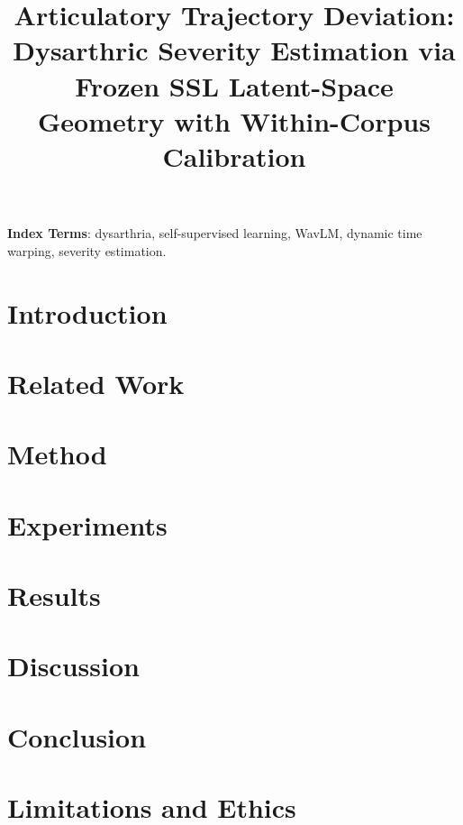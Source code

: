 \documentclass[a4paper]{article}
\title{Articulatory Trajectory Deviation: Dysarthric Severity
       Estimation via Frozen {SSL} Latent-Space Geometry with
       Within-Corpus Calibration}
\begin{document}
\maketitle

\begin{abstract}

\end{abstract}

\noindent\textbf{Index Terms}: dysarthria, self-supervised learning,
WavLM, dynamic time warping, severity estimation.

\section{Introduction}


\section{Related Work}


\section{Method}


\section{Experiments}


\section{Results}


\section{Discussion}


\section{Conclusion}


\section*{Limitations and Ethics}




\end{document}
